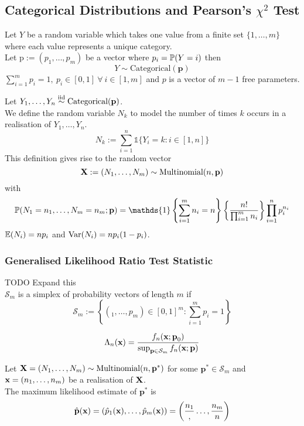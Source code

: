 \documentclass[11pt,a4paper]{article}
\begin{document}
\subsection{Categorical Distributions and Pearson's $\chi^2$ Test}

Let $Y$ be a random variable which takes one value from a finite set $\{1,\dots,m\}$ where each value represents a unique category.\\
Let $\text{p}:=(p_1,\dots,p_m)$ be a vector where $p_i=\mathbb{P}(Y=i)$ then
$$Y\sim\text{Categorical}(\textbf{p})$$
\nb $\sum_{i=1}^mp_i=1,\ p_i\in[0,1]\ \forall\ i\in[1,m]$ and $p$ is a vector of $m-1$ free parameters.\\


Let $Y_1,\dots,Y_n\overset{\text{iid}}{\sim}\text{Categorical}(\textbf{p})$.\\
We define the random variable $N_k$ to model the number of times $k$ occurs in a realisation of $Y_1,\dots,Y_n$.
$$N_k:=\sum_{i=1}^n\mathds{1}\{Y_i=k:i\in[1,n]\}$$
This definition gives rise to the random vector
$$\textbf{X}:=(N_1,\dots,N_m)\sim\text{Multinomial}(n,\textbf{p})$$
with
$$\prob(N_1=n_1,\dots,N_m=n_m;\textbf{p})=\mathds{1}\left\{\sum_{i=1}^mn_i=n\right\}\left\{\dfrac{n!}{\prod_{i=1}^mn_i}\right\}\prod_{i=1}^np_i^{n_i}$$
\nb $\mathbb{E}(N_i)=np_i$ and $\mathrm{Var}(N_i)=np_i(1-p_i)$.

\subsubsection{Generalised Likelihood Ratio Test Statistic}

TODO Expand this\\
$\mathcal{S}_m$ is a simplex of probability vectors of length $m$ if
$$\mathcal{S}_m:=\left\{(_1,\dots,p_m)\in[0,1]^m:\sum_{i=1}^mp_i=1\right\}$$

$$\Lambda_n(\textbf{x})=\frac{f_n(\textbf{x};\textbf{p}_0)}{\sup_{\textbf{p}\in\mathcal{S}_m}f_n(\textbf{x};\textbf{p})}$$

Let $\textbf{X}=(N_1,\dots,N_m)\sim\text{Multinomial}(n,\textbf{p}^*)$ for some $\textbf{p}^*\in\mathcal{S}_m$ and $\textbf{x}=(n_1,\dots,n_m)$ be a realisation of $\textbf{X}$.\\
The maximum likelihood estimate of $\textbf{p}^*$ is
$$\hat{\textbf{p}}(\textbf{x})=(\hat{p}_1(\textbf{x}),\dots,\hat{p}_m(\textbf{x}))=\left(\frac{n_1},\dots,\frac{n_m}{n}\right)$$
\end{document}
